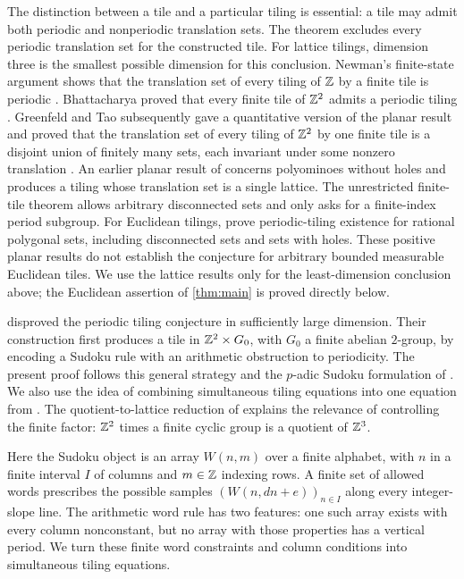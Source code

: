 The distinction between a tile and a particular tiling is essential: a tile
may admit both periodic and nonperiodic translation sets.  The theorem
excludes every periodic translation set for the constructed tile.
For lattice tilings, dimension three is the smallest possible dimension
for this conclusion. Newman's finite-state argument shows that the
translation set of every tiling of $\mathbb Z$ by a finite tile is periodic
\citep[proof of Theorem~2]{Newman}. Bhattacharya proved that every finite tile of $\mathbb Z^2$
admits a periodic tiling \citep[Theorem~1.1]{Bhattacharya}.  Greenfeld and Tao subsequently
gave a quantitative version of the planar result and proved that the
translation set of every tiling of $\mathbb Z^2$ by one finite tile is a disjoint
union of finitely many
sets, each invariant under some nonzero translation \citep[Theorems~1.3\textup{(i)} and~1.5]{GTStructure}.
An earlier planar result of \citet[Theorem~5.4]{WijshoffVanLeeuwen} concerns
polyominoes without holes and produces a tiling whose translation set
is a single lattice. The unrestricted finite-tile theorem allows
arbitrary disconnected sets and only asks for a finite-index period
subgroup. For Euclidean tilings, \citet[Theorem~1.1]{RationalPolygons}
prove periodic-tiling existence for rational polygonal sets, including
disconnected sets and sets with holes. These positive planar results
do not establish the conjecture for arbitrary bounded measurable
Euclidean tiles. We use the lattice results only for the least-dimension
conclusion above; the Euclidean assertion of \cref{thm:main} is proved
directly below.

\citet{GTPeriodic} disproved the periodic tiling conjecture in sufficiently
large dimension.  Their construction first produces a tile in
$\mathbb Z^2\times G_0$, with $G_0$ a finite abelian $2$-group, by encoding a
Sudoku rule with an arithmetic obstruction to periodicity.  The present
proof follows this general strategy and the $p$-adic Sudoku formulation of
\citet[Section~4]{GTUndecidable}.  We also use the idea of combining
simultaneous tiling equations into one equation from
\citet[Section~3]{GTPeriodic}.  The quotient-to-lattice reduction of
\citet[Theorem~1.1 and Corollary~1.2]{MSSReduction} explains the relevance of controlling the finite
factor: $\mathbb Z^2$ times a finite cyclic group is a quotient of $\mathbb Z^3$.

Here the Sudoku object is an array $W(n,m)$ over a finite alphabet,
with $n$ in a finite interval $I$ of columns and $m\in\mathbb Z$ indexing rows.
A finite set of allowed words prescribes the possible samples
$(W(n,dn+e))_{n\in I}$ along every integer-slope line. The arithmetic
word rule has two features: one such array exists with every column
nonconstant, but no array with those properties has a vertical period.
We turn these finite word constraints and column conditions into
simultaneous tiling equations.

